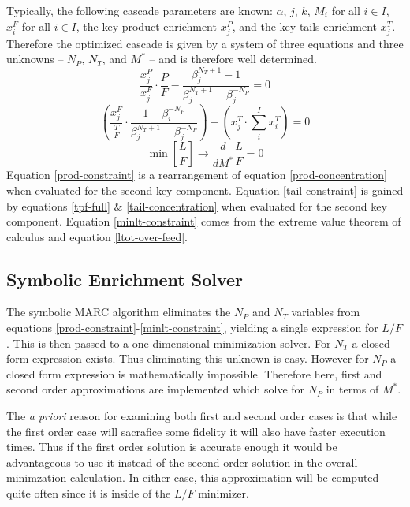 \documentclass{ansconf}
\begin{document}
Typically, the following cascade parameters are known:
$\alpha$, 
$j$, $k$, 
$M_i$ for all $i\in I$, 
$x_i^F$ for all $i\in I$, 
the key product enrichment $x_j^P$, and the key 
tails enrichment $x_j^T$.  Therefore the optimized cascade is given by 
a system of three equations and three unknowns --
$N_P$, $N_T$, and $M^*$ -- and is therefore well determined.
\begin{equation}
\frac{x_j^P}{x_j^F}\cdot\frac{P}{F} - \frac{\beta_j^{N_T+1} - 1}
                                           {\beta_j^{N_T+1} - \beta_j^{-N_P}} = 0
\label{prod-constraint}
\end{equation}
\begin{equation}
\left(\frac{x_j^F}{\frac{T}{F}} \cdot \frac{1 - \beta_i^{-N_P}}
                                           {\beta_j^{N_T+1} - \beta_j^{-N_P}} \right)
- \left(x_j^T\cdot\sum_i^{I} x_i^T\right) = 0
\label{tail-constraint}
\end{equation}
\begin{equation}
\min\left[\frac{L}{F}\right]\to \frac{d}{dM^*} \frac{L}{F} = 0
\label{minlt-constraint}
\end{equation}
Equation \ref{prod-constraint} is a rearrangement of equation \ref{prod-concentration}
when evaluated for the second key component.
Equation \ref{tail-constraint} is gained by equations \ref{tpf-full} \&
\ref{tail-concentration} when evaluated for the second key component.
Equation \ref{minlt-constraint} comes from the extreme value theorem of calculus
and equation \ref{ltot-over-feed}.

\subsection{Symbolic Enrichment Solver}
\label{sec:symes}

The symbolic MARC algorithm \cite{Scopatz2012} eliminates the $N_P$ and $N_T$ 
variables from equations \ref{prod-constraint}-\ref{minlt-constraint}, yielding a 
single expression for $L/F$.  This is then passed to a one dimensional minimization 
solver.  For $N_T$ a closed form expression exists.  Thus eliminating this unknown 
is easy.  However for $N_P$ a closed form expression is mathematically impossible.  
Therefore here, first and second order approximations are implemented which solve for
$N_P$ in terms of $M^*$.  

The \emph{a priori} reason for examining both first and second order cases is that 
while the first order case will sacrafice some fidelity it will also have faster 
execution times.  Thus if the first order solution is accurate enough it would be 
advantageous to use it instead of the second order solution in the overall 
minimzation calculation.  In either case, this approximation will be computed quite
often since it is inside of the $L/F$ minimizer.
\end{document}
